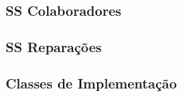 \documentclass[../../relatorio.tex]{subfiles}
\begin{document}
\subsubsection{SS Colaboradores} \label{sec:ss_colaboradores}


\subsubsection{SS Reparações} \label{sec:ss_reparacoes}


\subsubsection{Classes de Implementação} \label{sec:classes_implementacao}

\end{document}

